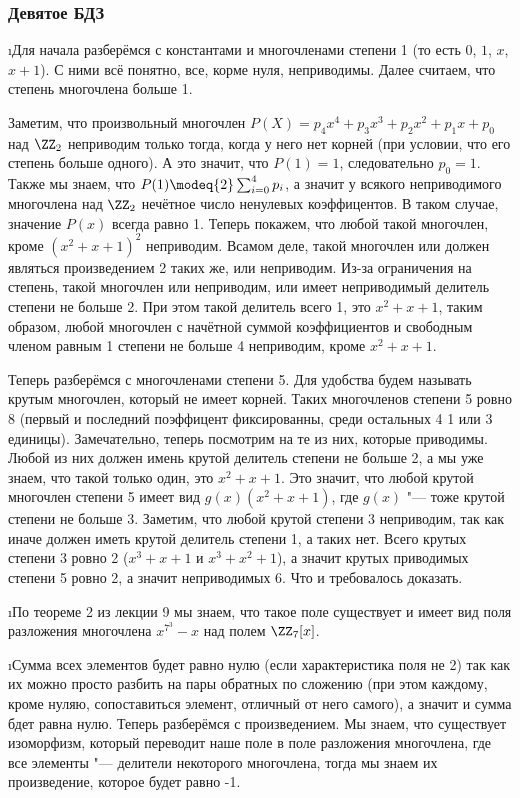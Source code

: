 \subsubsection{Девятое БДЗ}

\i Для начала разберёмся с константами и многочленами степени 1 (то есть $0$, $1$, $x$, $x+1$). С ними всё понятно, все, корме нуля, неприводимы. Далее считаем, что степень многочлена больше 1.
\par Заметим, что произвольный многочлен $P(X) = p_4x^4 + p_3x^3 + p_2x^2 + p_1x + p_0$ над $\ZZ_2$ неприводим только тогда, когда у него нет корней (при условии, что его степень больше одного). А это значит, что $P(1) = 1$, следовательно $p_0 = 1$. Также мы знаем, что $P(1) \modeq{2} \sum_{i=0}^4p_i$, а значит у всякого неприводимого многочлена над $\ZZ_2$ нечётное число ненулевых коэффицентов. В таком случае, значение $P(x)$ всегда равно 1. Теперь покажем, что любой такой многочлен, кроме $(x^2 + x + 1)^2$ неприводим. Всамом деле, такой многочлен или должен являться произведением 2 таких же, или неприводим. Из-за ограничения на степень, такой многочлен или неприводим, или имеет неприводимый делитель степени не больше 2. При этом такой делитель всего 1, это $x^2 + x + 1$, таким образом, любой многочлен с начётной суммой коэффициентов и свободным членом равным 1 степени не больше 4 неприводим, кроме $x^2 + x + 1$.
\par Теперь разберёмся с многочленами степени 5. Для удобства будем называть крутым многочлен, который не имеет корней. Таких многочленов степени 5 ровно 8 (первый и последний поэффицент фиксированны, среди остальных 4 1 или 3 единицы). Замечательно, теперь посмотрим на те из них, которые приводимы. Любой из них должен имень крутой делитель степени не больше 2, а мы уже знаем, что такой только один, это $x^2 + x + 1$. Это значит, что любой крутой многочлен степени 5 имеет вид $g(x)(x^2 + x + 1)$, где $g(x)$ "--- тоже крутой степени не больше 3. Заметим, что любой крутой степени 3 неприводим, так как иначе должен иметь крутой делитель степени 1, а таких нет. Всего крутых степени 3 ровно 2 ($x^3 + x + 1$ и $x^3 + x^2 + 1$), а значит крутых приводимых степени 5 ровно 2, а значит неприводимых 6. Что и требовалось доказать.


\i По теореме 2 из лекции 9 мы знаем, что такое поле существует и имеет вид поля разложения многочлена $x^{7^3} - x$ над полем $\ZZ_7[x]$. 


\i Сумма всех элементов будет равно нулю (если характеристика поля не 2) так как их можно просто разбить на пары обратных по сложению (при этом каждому, кроме нуляю, сопоставиться элемент, отличный от него самого), а значит и сумма бдет равна нулю. Теперь разберёмся с произведением. Мы знаем, что существует изоморфизм, который переводит наше поле в поле разложения многочлена, где все элементы "--- делители некоторого многочлена, тогда мы знаем их произведение, которое будет равно -1.



